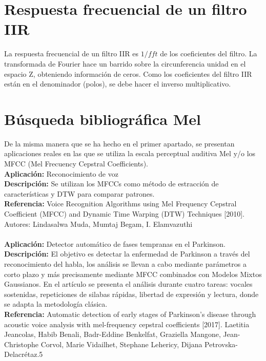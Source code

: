 \documentclass[12pt]{article}
\begin{document}
\section{Respuesta frecuencial de un filtro IIR}
La respuesta frecuencial de un filtro IIR es $1/fft$ de los coeficientes del filtro. La transformada de Fourier hace un barrido sobre la circunferencia unidad en el espacio Z, obteniendo información de ceros. Como los coeficientes del filtro IIR están en el denominador (polos), se debe hacer el inverso multiplicativo.


\section{Búsqueda bibliográfica Mel}
De la misma manera que se ha hecho en el primer apartado, se presentan aplicaciones reales en las que se utiliza la escala perceptual auditiva Mel y/o los MFCC (Mel Frecuency Cepstral Coefficients).\\

\textbf{Aplicación:} Reconocimiento de voz\\
\textbf{Descripción:} Se utilizan los MFCCs como método de estracción de características y DTW para comparar patrones.\\
\textbf{Referencia:} Voice Recognition Algorithms using Mel Frequency Cepstral Coefficient (MFCC) and Dynamic Time Warping (DTW) Techniques [2010]. Autores: Lindasalwa Muda, Mumtaj Begam, I. Elamvazuthi\\\\

\textbf{Aplicación:} Detector automático de fases tempranas en el Parkinson.\\
\textbf{Descripción:} El objetivo es detectar la enfermedad de Parkinson a través del reconocimiento del habla, los análisis se llevan a cabo mediante parámetros a corto plazo y más precisamente mediante MFCC combinados con Modelos Mixtos Gaussianos. 
En el artículo se presenta el análisis durante cuatro tareas: vocales sostenidas, repeticiones de silabas rápidas, libertad de expresión y lectura, donde se adapta la metodología clásica.\\
\textbf{Referencia:} Automatic detection of early stages of Parkinson's disease through acoustic voice analysis with mel-frequency cepstral coefficients [2017]. Laetitia Jeancolas, Habib Benali, Badr-Eddine Benkelfat, Graziella Mangone, Jean-Christophe Corvol, Marie Vidailhet, Stephane Lehericy, Dijana Petrovska-Delacrétaz.5\\\\
\end{document}
